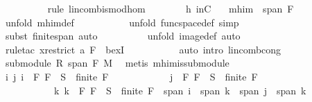 \begin{isabellebody}
\ \ \ \ \ \ \ \ \isamarkupfalse%
\ {\isacharparenleft}rule\ lincomb{\isacharunderscore}is{\isacharunderscore}mod{\isacharunderscore}hom{\isacharparenright}\isanewline
\ \ \ \ \ \ \isamarkupfalse%
\ h{}\ inC\ \isamarkupfalse%
\ {}{\isacharcolon}\ {\isachardoublequoteopen}mh{\isachardot}im\ {\isacharequal}\ span\ F{\isachardoublequoteclose}\ \isanewline
\ \ \ \ \ \ \ \ \isamarkupfalse%
\ {\isacharparenleft}unfold\ mh{\isachardot}im{\isacharunderscore}def{\isacharparenright}\ \isanewline
\ \ \ \ \ \ \ \ \isamarkupfalse%
\ {\isacharparenleft}unfold\ func{\isacharunderscore}space{\isacharunderscore}def{\isacharcomma}\ simp{\isacharparenright}\ \isanewline
\ \ \ \ \ \ \ \ \isamarkupfalse%
\ {\isacharparenleft}subst\ finite{\isacharunderscore}span{\isacharcomma}\ auto{\isacharparenright}\isanewline
\ \ \ \ \ \ \ \ \isamarkupfalse%
\ {\isacharparenleft}unfold\ image{\isacharunderscore}def{\isacharcomma}\ auto{\isacharparenright}\isanewline
\ \ \ \ \ \ \ \ \isamarkupfalse%
\ {\isacharparenleft}rule{\isacharunderscore}tac\ x{\isacharequal}{\isachardoublequoteopen}restrict\ a\ F{\isachardoublequoteclose}\ \ bexI{\isacharparenright}\isanewline
\ \ \ \ \ \ \ \ \ \isamarkupfalse%
\ {\isacharparenleft}auto\ intro{\isacharbang}{\isacharcolon}\ lincomb{\isacharunderscore}cong{\isacharparenright}\isanewline
\ \ \ \ \ \ \isamarkupfalse%
\ {}\ \isamarkupfalse%
\ {\isachardoublequoteopen}submodule\ R\ {\isacharparenleft}span\ F{\isacharparenright}\ M{\isachardoublequoteclose}\ \isamarkupfalse%
\ {\isacharparenleft}metis\ mh{\isachardot}im{\isacharunderscore}is{\isacharunderscore}submodule{\isacharparenright}\isanewline
\ \ \ \ \isamarkupfalse%
\isanewline
\ \ \isamarkupfalse%
\ \isanewline
\ \ \ \ \isamarkupfalse%
\ {\isachardoublequoteopen}{\isasymAnd}i\ j{\isachardot}\ i\ {\isasymin}\ {\isacharbraceleft}F{\isachardot}\ F\ {\isasymsubseteq}\ S\ {\isasymand}\ finite\ F{\isacharbraceright}\ {\isasymLongrightarrow}\isanewline
\ \ \ \ \ \ \ \ \ \ \ j\ {\isasymin}\ {\isacharbraceleft}F{\isachardot}\ F\ {\isasymsubseteq}\ S\ {\isasymand}\ finite\ F{\isacharbraceright}\ {\isasymLongrightarrow}\isanewline
\ \ \ \ \ \ \ \ \ \ \ {\isasymexists}k{\isachardot}\ k\ {\isasymin}\ {\isacharbraceleft}F{\isachardot}\ F\ {\isasymsubseteq}\ S\ {\isasymand}\ finite\ F{\isacharbraceright}\ {\isasymand}\ span\ i\ {\isasymsubseteq}\ span\ k\ {\isasymand}\ span\ j\ {\isasymsubseteq}\ span\ k{\isachardoublequoteclose}\isanewline

\end{isabellebody}
